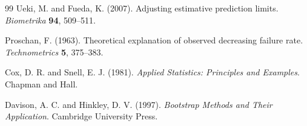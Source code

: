 \documentclass[11pt]{article}
\theoremstyle{remark}
\begin{document}
\begin{thebibliography}{99}
Ueki, M. and Fueda, K. (2007). Adjusting estimative prediction limits. \emph{Biometrika} \textbf{94}, 509--511.

Proschan, F. (1963). Theoretical explanation of observed decreasing failure rate. \emph{Technometrics} \textbf{5}, 375--383.

Cox, D. R. and Snell, E. J. (1981). \emph{Applied Statistics: Principles and Examples}. Chapman and Hall.

Davison, A. C. and Hinkley, D. V. (1997). \emph{Bootstrap Methods and Their Application}. Cambridge University Press.

\end{thebibliography}
\end{document}
